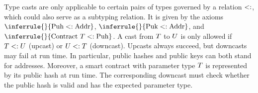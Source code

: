 \documentclass[a4paper]{llncs}
\begin{document}


Type casts are only applicable to certain pairs of
types governed by a relation $<:$, which could also serve as a
subtyping relation. It is given by the axioms
$\inferrule{}{\TPUH \SubType \TADDR}$, $\inferrule{}{\TPUK \SubType
  \TADDR}$, and $\inferrule{}{\TCONTRACT\ \TYPE \SubType \TPUH}$.
A cast from $T$ to $U$ is only allowed
if $T <: U$ (upcast) or $U <: T$
(downcast). Upcasts always succeed, but downcasts may fail at run time.
In particular,  public hashes and public keys can both stand for addresses. Moreover, a smart
contract with parameter type $T$ is represented by its public hash
at run time. The corresponding downcast must check whether the public
hash is valid and has the expected parameter type.
\end{document}
